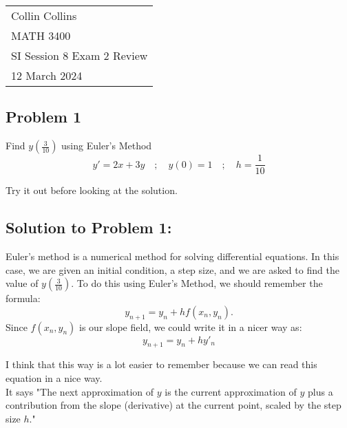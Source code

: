 \documentclass[a4paper,12pt]{article} %
\begin{document}



\thispagestyle{empty} %

\begin{tabular}{p{15.5cm}} %
\\ Collin Collins \\
MATH 3400\\
SI Session 8 Exam 2 Review\\
12 March 2024 \\
\hline %

\end{tabular} 

\subsection*{Problem 1}
Find $y(\frac{3}{10})$ using Euler's Method
$$ y' = 2x + 3y \quad;\quad y(0) = 1 \quad;\quad h=\frac{1}{10} $$

Try it out before looking at the solution.

\pagebreak

\subsection*{Solution to Problem 1:}

Euler's method is a numerical method for solving differential equations. In this case, we are given an initial condition, a step size, and we are asked to find the value of $y(\frac{3}{10})$. To do this using Euler's Method, we should remember the formula:
$$ y_{n+1} = y_n + hf(x_n, y_n). $$
Since $f(x_n, y_n)$ is our slope field, we could write it in a nicer way as:
$$ \boxed{y_{n+1} = y_n + hy'_n} $$

I think that this way is a lot easier to remember because we can read this equation in a nice way.\\

 It says "The next approximation of $y$ is the current approximation of $y$ plus a contribution from the slope (derivative) at the current point, scaled by the step size $h$."\\
 
\end{document}
